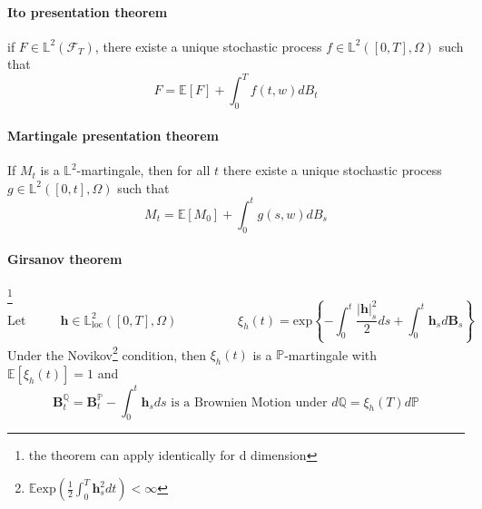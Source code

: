 \documentclass[a4paper,10pt]{article}
\begin{document}
\paragraph{Ito presentation theorem}
if $F \in \mathbb{L}^2(\mathcal{F}_T)$, there existe a unique stochastic process $f\in \mathbb{L}^2([0,T],\Omega)$ such that
\[
F = \mathbb{E}[F] + \int_0^T f(t,w)dB_t
\]
\paragraph{Martingale presentation theorem}
If $M_t$ is a $\mathbb{L}^2$-martingale, then for all $t$ there existe a unique stochastic process $g\in \mathbb{L}^2([0,t],\Omega)$ such that
\[
M_t = \mathbb{E}[M_0] + \int_0^t g(s,w)dB_s
\]
\paragraph{Girsanov theorem}\footnote{the theorem can apply identically for d dimension}
\[
\text{Let }\hspace{1cm}
\textbf{h}\in \mathbb{L}_{\text{loc}}^2([0,T],\Omega)
\hspace{2cm}
\xi_h(t) = \text{exp}\left\{ -\int_0^t \frac{ |\textbf{h}|_s^2 }{2} ds + \int_0^t \textbf{h}_s d\textbf{B}_s \right\}
\]
Under the Novikov\footnote{$\mathbb{E}\text{exp}(\frac{1}{2}\int_0^T \textbf{h}^2_sdt) < \infty $} condition, then $\xi_h(t)$ is a $\mathbb{P}$-martingale with $\mathbb{E}[\xi_h(t)]=1$ and
\[
\textbf{B}^{\mathbb{Q}}_t = \textbf{B}^{\mathbb{P}}_t - \int_0^t \textbf{h}_sds \text{ is a Brownien Motion under }d\mathbb{Q} =\xi_h(T) d\mathbb{P}
\]
\end{document}
